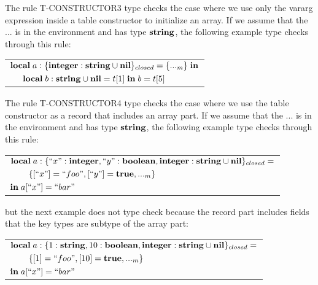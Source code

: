 The rule \textsc{T-CONSTRUCTOR3} type checks the case where we use
only the vararg expression inside a table constructor to initialize
an array.
If we assume that the $...$ is in the environment and has type $\mathbf{string}$,
the following example type checks through this rule:
\begin{center}
\begin{tabular}{ll}
\multicolumn{2}{l}{$\mathbf{local} \; a:\{\mathbf{integer}:\mathbf{string} \cup \mathbf{nil}\}_{closed} = \{ {...}_{m} \} \; \mathbf{in}$}\\
& \multicolumn{1}{l}{$\mathbf{local} \; b:\mathbf{string} \cup \mathbf{nil} = t[1] \; \mathbf{in} \; b = t[5]$}
\end{tabular}
\end{center}

The rule \textsc{T-CONSTRUCTOR4} type checks the case where we use
the table constructor as a record that includes an array part.
If we assume that the $...$ is in the environment and has type $\mathbf{string}$,
the following example type checks through this rule:
\begin{center}
\begin{tabular}{ll}
\multicolumn{2}{l}{$\mathbf{local} \; a:\{``x":\mathbf{integer}, ``y":\mathbf{boolean}, \mathbf{integer}:\mathbf{string} \cup \mathbf{nil}\}_{closed} =$}\\
& \multicolumn{1}{l}{$\{ [``x"] = ``foo", [``y"] = \mathbf{true}, {...}_{m} \}$}\\
\multicolumn{2}{l}{$\mathbf{in} \; a[``x"] = ``bar"$}
\end{tabular}
\end{center}
but the next example does not type check because the record part
includes fields that the key types are subtype of the array part:
\begin{center}
\begin{tabular}{ll}
\multicolumn{2}{l}{$\mathbf{local} \; a:\{1:\mathbf{string}, 10:\mathbf{boolean}, \mathbf{integer}:\mathbf{string} \cup \mathbf{nil}\}_{closed} =$}\\
& \multicolumn{1}{l}{$\{ [1] = ``foo", [10] = \mathbf{true}, {...}_{m} \}$}\\
\multicolumn{2}{l}{$\mathbf{in} \; a[``x"] = ``bar"$}
\end{tabular}
\end{center}

